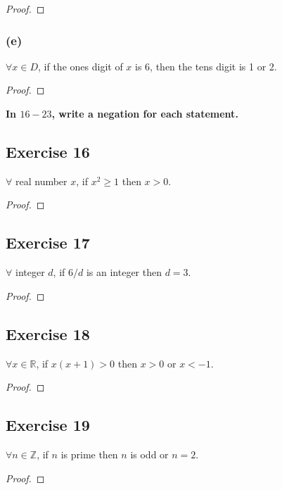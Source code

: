 \documentclass[14pt]{extarticle}
\newcommand{\R}{\mathbb{R}}
\newcommand{\Z}{\mathbb{Z}}
\newcommand{\fa}{\forall}
\begin{document}
\begin{proof}

\end{proof}

\subsubsection{(e)}
$\fa x \in D$, if the ones digit of $x$ is 6, then the tens digit is 1 or 2.

\begin{proof}

\end{proof}

{\bf \color{cyan} In $16-23$, write a negation for each statement.}

\subsection{Exercise 16}
$\fa$ real number $x$, if $x^2 \geq 1$ then $x > 0$.

\begin{proof}

\end{proof}

\subsection{Exercise 17}
$\fa$ integer $d$, if $6 / d$ is an integer then $d = 3$.

\begin{proof}

\end{proof}

\subsection{Exercise 18}
$\fa x \in \R$, if $x(x + 1) > 0$ then $x > 0$ or $x < -1$.

\begin{proof}

\end{proof}

\subsection{Exercise 19}
$\fa n \in \Z$, if $n$ is prime then $n$ is odd or $n = 2$.

\begin{proof}

\end{proof}
\end{document}
